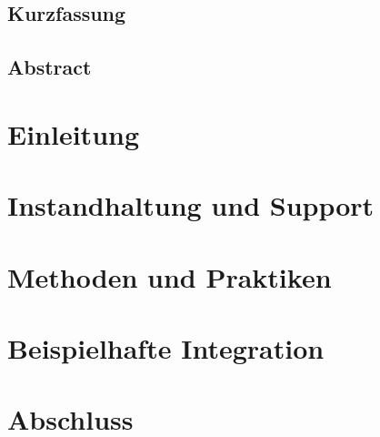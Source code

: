 \documentclass[oneside, ngerman, final, 11pt, a4paper, 1.1headlines, headinclude=false, footinclude=false, mpinclude=false, pagesize, onecolumn, titlepage, parskip=half, headsepline, chapterprefix=false, version=first, listof=totoc, bibliography=totoc, toc=graduated, fleqn, twoside=true]{scrbook}
\begin{document}
	
	\newpage{}
	
	\section*{\thispagestyle{empty}Kurzfassung}
	
	\textit{\lipsum[1-4]}
	
	\newpage{}
	
	\section*{\thispagestyle{empty}Abstract}
	
	\textit{\lipsum[1-4]}
	
	\newpage{}
	
	\setcounter{page}{1}
	
	\tableofcontents{}
	
	\newpage{}
	
	\setcounter{page}{1} 
	
	\chapter{Einleitung}
	
	
	\chapter{Instandhaltung und Support}
	
	
	\chapter{Methoden und Praktiken}
	
	
	\chapter{Beispielhafte Integration}
	
	
	\chapter{Abschluss}
	
	
%	
	
\end{document}
